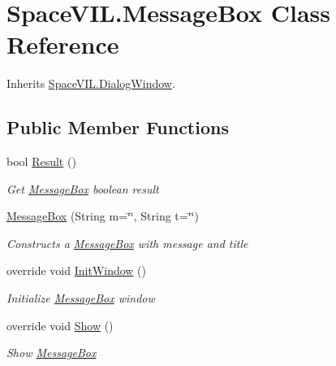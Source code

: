 \hypertarget{class_space_v_i_l_1_1_message_box}{}\section{Space\+V\+I\+L.\+Message\+Box Class Reference}
\label{class_space_v_i_l_1_1_message_box}


Inherits \mbox{\hyperlink{class_space_v_i_l_1_1_dialog_window}{Space\+V\+I\+L.\+Dialog\+Window}}.

\subsection*{Public Member Functions}
\begin{DoxyCompactItemize}
\item 
bool \mbox{\hyperlink{class_space_v_i_l_1_1_message_box_a9f0785f2987c4aa2aa1efb2c7323e3c2}{Result}} ()
\begin{DoxyCompactList}\small\item\em Get \mbox{\hyperlink{class_space_v_i_l_1_1_message_box}{Message\+Box}} boolean result \end{DoxyCompactList}\item 
\mbox{\hyperlink{class_space_v_i_l_1_1_message_box_a127851c5ef0b92c55134c37820b5e459}{Message\+Box}} (String m=\char`\"{}\char`\"{}, String t=\char`\"{}\char`\"{})
\begin{DoxyCompactList}\small\item\em Constructs a \mbox{\hyperlink{class_space_v_i_l_1_1_message_box}{Message\+Box}} with message and title \end{DoxyCompactList}\item 
override void \mbox{\hyperlink{class_space_v_i_l_1_1_message_box_ac14ecd2643e043c578ef4cf568887daf}{Init\+Window}} ()
\begin{DoxyCompactList}\small\item\em Initialize \mbox{\hyperlink{class_space_v_i_l_1_1_message_box}{Message\+Box}} window \end{DoxyCompactList}\item 
override void \mbox{\hyperlink{class_space_v_i_l_1_1_message_box_a2d2963f79fd8eb73c03872eee52b4331}{Show}} ()
\begin{DoxyCompactList}\small\item\em Show \mbox{\hyperlink{class_space_v_i_l_1_1_message_box}{Message\+Box}} \end{DoxyCompactList}\end{DoxyCompactItemize}

